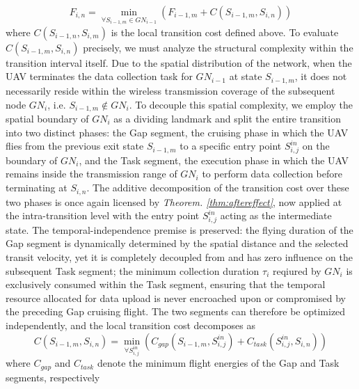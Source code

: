 \begin{equation}
    F_{i,n} = \min_{\forall S_{i-1,m}\in GN_{i-1}}(F_{i-1,m}+C(S_{i-1,m},S_{i,n}))
    \label{equ:ore_1}
\end{equation}
where $C(S_{i-1,n}, S_{i,m})$ is the local transition cost defined above.
To evaluate $C(S_{i-1,m},S_{i,n})$ precisely, we must analyze the structural complexity within the transition interval itself.
Due to the spatial distribution of the network, when the UAV terminates the data collection task for $GN_{i-1}$ at state $S_{i-1,m}$, it does not necessarily reside within the wireless transmission coverage of the subsequent node $GN_i$, i.e. $S_{i-1,m} \notin GN_i$.
To decouple this spatial complexity, we employ the spatial boundary of $GN_i$ as a dividing landmark and split the entire transition into two distinct phases: the Gap segment, the cruising phase in which the UAV flies from the previous exit state $S_{i-1,m}$ to a specific entry point $S^{in}_{i,j}$ on the boundary of $GN_i$, and the Task segment, the execution phase in which the UAV remains inside the transmission range of $GN_i$ to perform data collection before terminating at $S_{i,n}$.
The additive decomposition of the transition cost over these two phases is once again licensed by \textit{Theorem. \ref{thm:aftereffect}}, now applied at the intra-transition level with the entry point $S^{in}_{i,j}$  acting as the intermediate state.
The temporal-independence premise is preserved: the flying duration of the Gap segment is dynamically determined by the spatial distance and the selected transit velocity, yet it is completely decoupled from and has zero influence on the subsequent Task segment; the minimum collection duration $\tau_i$ reqiured by $GN_i$ is exclusively consumed within the Task segment, ensuring that the temporal resource allocated for data upload is never encroached upon or compromised by the preceding Gap cruising flight.
The two segments can therefore be optimized independently, and the local transition cost decomposes as
\begin{equation}
     C(S_{i-1,m},S_{i,n}) = \min_{\forall S^{in}_{i,j}}(C_{gap}(S_{i-1,m},S^{in}_{i,j})+C_{task}(S^{in}_{i,j},S_{i,n})) 
     \label{equ:local_transition}
\end{equation}
where $C_{gap}$ and $C_{task}$ denote the minimum flight energies of the Gap and Task segments, respectively


